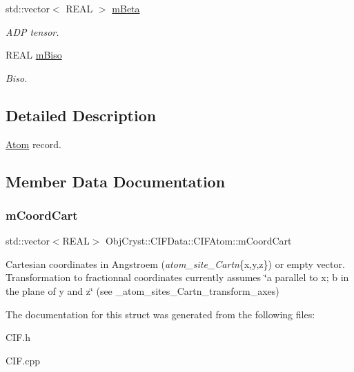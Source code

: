 \begin{DoxyCompactItemize}
\mbox{\label{struct_obj_cryst_1_1_c_i_f_data_1_1_c_i_f_atom_a2d65646b10236c22a4de7f2c1ecb55dd}} 
std\+::vector$<$ R\+E\+AL $>$ \mbox{\hyperlink{struct_obj_cryst_1_1_c_i_f_data_1_1_c_i_f_atom_a2d65646b10236c22a4de7f2c1ecb55dd}{m\+Beta}}
\begin{DoxyCompactList}\small\item\em A\+DP tensor. \end{DoxyCompactList}\item 
\mbox{\label{struct_obj_cryst_1_1_c_i_f_data_1_1_c_i_f_atom_aae93904956b8755e209fe7dd1151b800}} 
R\+E\+AL \mbox{\hyperlink{struct_obj_cryst_1_1_c_i_f_data_1_1_c_i_f_atom_aae93904956b8755e209fe7dd1151b800}{m\+Biso}}
\begin{DoxyCompactList}\small\item\em Biso. \end{DoxyCompactList}\end{DoxyCompactItemize}


\subsection{Detailed Description}
\mbox{\hyperlink{class_obj_cryst_1_1_atom}{Atom}} record. 

\subsection{Member Data Documentation}
\mbox{\label{struct_obj_cryst_1_1_c_i_f_data_1_1_c_i_f_atom_a41f73d2cfecece32b4e2b60bc6bbff11}} 
\subsubsection{\texorpdfstring{mCoordCart}{mCoordCart}}
{\footnotesize\ttfamily std\+::vector$<$R\+E\+AL$>$ Obj\+Cryst\+::\+C\+I\+F\+Data\+::\+C\+I\+F\+Atom\+::m\+Coord\+Cart}

Cartesian coordinates in Angstroem ({\itshape atom\+\_\+site\+\_\+\+Cartn}\{x,y,z\}) or empty vector. Transformation to fractionnal coordinates currently assumes \char`\"{}a parallel to x; b in the plane of y and z\char`\"{} (see \+\_\+atom\+\_\+sites\+\_\+\+Cartn\+\_\+transform\+\_\+axes) 

The documentation for this struct was generated from the following files\+:\begin{DoxyCompactItemize}
\item 
C\+I\+F.\+h\item 
C\+I\+F.\+cpp\end{DoxyCompactItemize}
